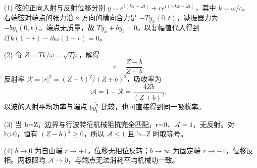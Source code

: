 (1) 弦的正向入射与反射位移分别 \(y=e^{i(kx-\omega t)}+re^{i(-kx-\omega t)}\)，其中 \(k=\omega/c\)。右端弦对端点的张力沿 x 方向的横向合力是 \(-T y_x(0,t)\)，减振器力为 \(-b y_t(0,t)\)。端点无质量，故 \(Ty_x+b y_t=0\)。以复幅值代入得到 \(iTk(1-r)-i b\omega(1+r)=0\)。

(2) 令 \(Z=Tk/\omega=\sqrt{T\mu}\)，解得
\[
r=\frac{Z-b}{Z+b}.
\]
反射率 \(\mathcal R=|r|^2=(Z-b)^2/(Z+b)^2\)，吸收率为
\[
\mathcal A=1-\mathcal R=\frac{4Zb}{(Z+b)^2}.
\]
以波的入射平均功率与端点 \(b\overline{y_t^2}\) 比较，也可直接得到同一吸收率。

(3) 当 b=Z，边界与行波特征机械阻抗完全匹配，r=0、\(\mathcal A=1\)，无反射。对 b>0，恒有 \((Z-b)^2\ge0\)，所以 \(\mathcal A\le1\) 且 b=Z 时取等号。

(4) \(b\to 0\) 为自由端 \(r\to +1\)，位移无相位反转；\(b\to \infty \) 为固定端 \(r\to -1\)，位移反相。两极限均 \(\mathcal A\to0\)，与端点无法消耗平均机械功一致。
